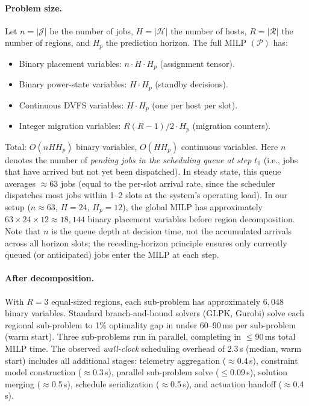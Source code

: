 \documentclass[a4paper,fleqn]{cas-dc}
\begin{document}
\paragraph{Problem size.}
Let $n = |\mathcal{J}|$ be the number of jobs, $H = |\mathcal{H}|$ the number of hosts, $R = |\mathcal{R}|$ the number of regions, and $H_p$ the prediction horizon. The full MILP $(\mathcal{P})$ has:
\begin{itemize}
  \item Binary placement variables: $n \cdot H \cdot H_p$ (assignment tensor).
  \item Binary power-state variables: $H \cdot H_p$ (standby decisions).
  \item Continuous DVFS variables: $H \cdot H_p$ (one per host per slot).
  \item Integer migration variables: $R(R-1)/2 \cdot H_p$ (migration counters).
\end{itemize}
Total: $O(n H H_p)$ binary variables, $O(H H_p)$ continuous variables. Here $n$ denotes the number of \emph{pending jobs in the scheduling queue at step $t_0$} (i.e., jobs that have arrived but not yet been dispatched). In steady state, this queue averages $\approx$63 jobs (equal to the per-slot arrival rate, since the scheduler dispatches most jobs within 1--2 slots at the system's operating load). In our setup ($n \approx 63$, $H=24$, $H_p=12$), the global MILP has approximately $63 \times 24 \times 12 \approx 18{,}144$ binary placement variables before region decomposition. Note that $n$ is the queue depth at decision time, not the accumulated arrivals across all horizon slots; the receding-horizon principle ensures only currently queued (or anticipated) jobs enter the MILP at each step.

\paragraph{After decomposition.}
With $R=3$ equal-sized regions, each sub-problem has approximately $6{,}048$ binary variables. Standard branch-and-bound solvers (GLPK, Gurobi) solve each regional sub-problem to 1\% optimality gap in under 60--90\,ms per sub-problem (warm start). Three sub-problems run in parallel, completing in $\leq$90\,ms total MILP time. The observed \emph{wall-clock} scheduling overhead of 2.3\,s (median, warm start) includes all additional stages: telemetry aggregation ($\approx$0.4\,s), constraint model construction ($\approx$0.3\,s), parallel sub-problem solve ($\leq$0.09\,s), solution merging ($\approx$0.5\,s), schedule serialization ($\approx$0.5\,s), and actuation handoff ($\approx$0.4\,s).
\end{document}
